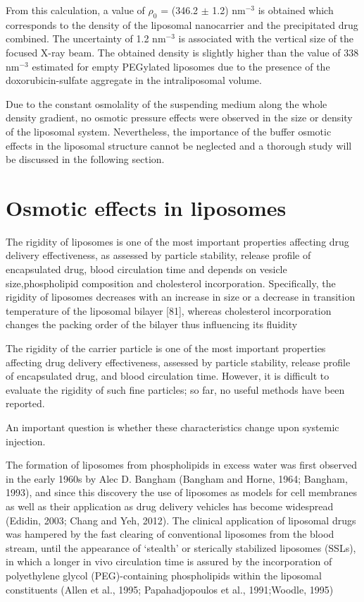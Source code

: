 From this calculation, a value of $\rho_0$ = (346.2 $\pm$ 1.2) nm$^{-3}$ is obtained which corresponds to the density of the liposomal nanocarrier and the precipitated drug combined. The uncertainty of 1.2 nm$^{-3}$ is associated with the vertical size of the focused X-ray beam. The obtained density is slightly higher than the value of 338 nm$^{-3}$ estimated for empty PEGylated liposomes \cite{kucerka_structure_2006} due to the presence of the doxorubicin-sulfate aggregate in the intraliposomal volume. 

Due to the constant osmolality of the suspending medium along the whole density gradient, no osmotic pressure effects were observed in the size or density of the liposomal system. Nevertheless, the importance of the buffer osmotic effects in the liposomal structure cannot be neglected and a thorough study will be discussed in the following section.

\section{Osmotic effects in liposomes}

The  rigidity  of  liposomes  is  one  of  the  most  important properties affecting drug delivery effectiveness, as assessed by  particle  stability,  release  profile  of  encapsulated  drug, blood  circulation  time  and  depends  on  vesicle  size,phospholipid  composition  and  cholesterol  incorporation. Specifically,  the  rigidity  of  liposomes  decreases  with  an increase  in  size  or  a  decrease  in  transition  temperature  of the   liposomal   bilayer   [81],   whereas   cholesterol incorporation changes the packing order of the bilayer thus influencing   its   fluidity

The rigidity of the carrier particle is one of the most important properties affecting drug delivery effectiveness, assessed by particle stability, release profile of encapsulated drug, and blood circulation time. However, it is difficult to evaluate the rigidity of such fine particles; so far, no useful methods have been reported. 

An important question is whether these characteristics change upon systemic injection.

The formation of liposomes from phospholipids in excess water was first observed in the early 1960s by Alec D. Bangham (Bangham and Horne, 1964; Bangham, 1993), and since this discovery the use of liposomes as models for cell membranes as well as their application as drug delivery vehicles has become widespread (Edidin, 2003; Chang and Yeh, 2012). The clinical application of liposomal drugs was hampered by the fast clearing of conventional liposomes from the blood stream, until the appearance of ‘stealth’ or sterically stabilized liposomes (SSLs), in which a longer in vivo circulation time is assured by the incorporation of polyethylene glycol (PEG)-containing phospholipids within the liposomal constituents (Allen et al., 1995; Papahadjopoulos et al., 1991;Woodle, 1995)

